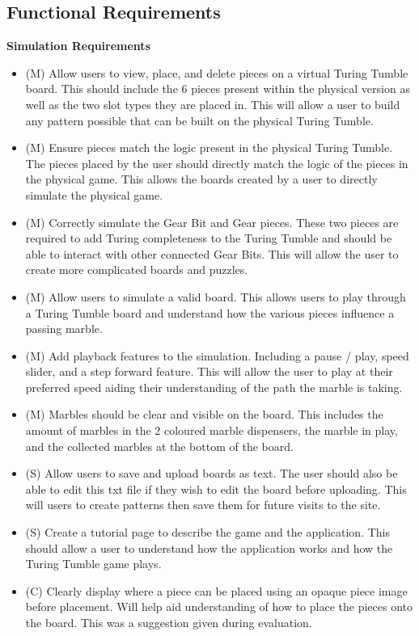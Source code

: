 \documentclass{l4proj}
\begin{document}
\subsection{Functional Requirements}
\textbf{Simulation Requirements}
\begin{itemize}
    \item (M) Allow users to view, place, and delete pieces on a virtual Turing Tumble board. This should include the 6 pieces present within the physical version as well as the two slot types they are placed in. This will allow a user to build any pattern possible that can be built on the physical Turing Tumble.
    \item (M) Ensure pieces match the logic present in the physical Turing Tumble. The pieces placed by the user should directly match the logic of the pieces in the physical game. This allows the boards created by a user to directly simulate the physical game.
    \item (M) Correctly simulate the Gear Bit and Gear pieces. These two pieces are required to add Turing completeness to the Turing Tumble and should be able to interact with other connected Gear Bits. This will allow the user to create more complicated boards and puzzles.
    \item (M) Allow users to simulate a valid board. This allows users to play through a Turing Tumble board and understand how the various pieces influence a passing marble.
    \item (M) Add playback features to the simulation. Including a pause / play, speed slider, and a step forward feature. This will allow the user to play at their preferred speed aiding their understanding of the path the marble is taking.
    \item (M) Marbles should be clear and visible on the board. This includes the amount of marbles in the 2 coloured marble dispensers, the marble in play, and the collected marbles at the bottom of the board.
    \item (S) Allow users to save and upload boards as text. The user should also be able to edit this txt file if they wish to edit the board before uploading. This will users to create patterns then save them for future visits to the site.
    \item (S) Create a tutorial page to describe the game and the application. This should allow a user to understand how the application works and how the Turing Tumble game plays.
    \item (C) Clearly display where a piece can be placed using an opaque piece image before placement. Will help aid understanding of how to place the pieces onto the board. This was a suggestion given during evaluation.

\end{itemize}
\end{document}
